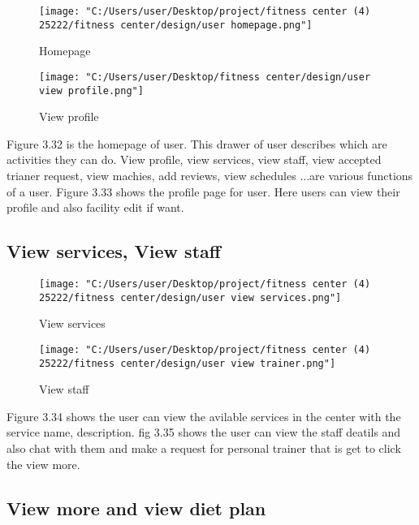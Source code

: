 \documentclass[a4paper,12pt,toc=flat]{report}
\begin{document}
{{	\begin{figure}[!ht]
		\begin{minipage}{0.45\linewidth}
			\texttt{[image: "C:/Users/user/Desktop/project/fitness center (4) 25222/fitness center/design/user homepage.png"]}
			\caption{Homepage}
		\end{minipage}
		\hfill
		\begin{minipage}{0.45\linewidth}
			\texttt{[image: "C:/Users/user/Desktop/fitness center/design/user view profile.png"]}
			\caption{ View profile}
		\end{minipage}
	\end{figure}
	 \hspace*{12pt}Figure 3.32 is the  homepage of user. This drawer of user describes which are activities they can do. View profile, view services, view staff, view accepted trianer request, view machies, add reviews, view schedules ...are various functions of a user. Figure 3.33 shows the profile page for user. Here users can view their profile and also facility edit if want.
	\pagebreak
	\subsection{View services, View staff}
	
	\begin{figure}[!ht]
		\begin{minipage}{0.45\linewidth}
			\texttt{[image: "C:/Users/user/Desktop/project/fitness center (4) 25222/fitness center/design/user view services.png"]}
			\caption{View services}
		\end{minipage}
		\hfill
		\begin{minipage}{0.45\linewidth}
			\texttt{[image: "C:/Users/user/Desktop/project/fitness center (4) 25222/fitness center/design/user view trainer.png"]}
			\caption{ View staff}
		\end{minipage}
	\end{figure}
	 \hspace*{12pt}Figure 3.34 shows the user can view the avilable services in the center with the service name, description. fig 3.35 shows the user can view the staff deatils and also chat with them and make a request for personal trainer that is get to click the view more.
	\pagebreak
	\subsection{View more and view diet plan}
	
}}
\end{document}
